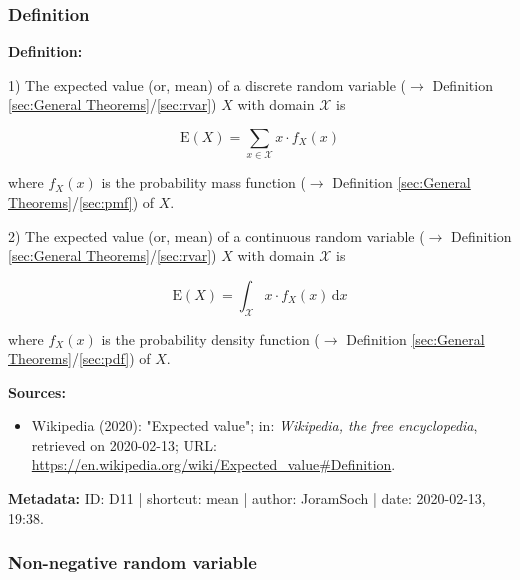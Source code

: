\documentclass[a4paper,12pt,twoside]{book}
\begin{document}
\subsubsection[\textit{Definition}]{Definition} \label{sec:mean}
\setcounter{equation}{0}

\textbf{Definition:}

1) The expected value (or, mean) of a discrete random variable ($\rightarrow$ Definition \ref{sec:General Theorems}/\ref{sec:rvar}) $X$ with domain $\mathcal{X}$ is

\begin{equation} \label{eq:mean-mean-disc}
\mathrm{E}(X) = \sum_{x \in \mathcal{X}} x \cdot f_X(x)
\end{equation}

where $f_X(x)$ is the probability mass function ($\rightarrow$ Definition \ref{sec:General Theorems}/\ref{sec:pmf}) of $X$.

\vspace{1em}
2) The expected value (or, mean) of a continuous random variable ($\rightarrow$ Definition \ref{sec:General Theorems}/\ref{sec:rvar}) $X$ with domain $\mathcal{X}$ is

\begin{equation} \label{eq:mean-mean-cont}
\mathrm{E}(X) = \int_{\mathcal{X}} x \cdot f_X(x) \, \mathrm{d}x
\end{equation}

where $f_X(x)$ is the probability density function ($\rightarrow$ Definition \ref{sec:General Theorems}/\ref{sec:pdf}) of $X$.


\vspace{1em}
\textbf{Sources:}
\begin{itemize}
\item Wikipedia (2020): "Expected value"; in: \textit{Wikipedia, the free encyclopedia}, retrieved on 2020-02-13; URL: \url{https://en.wikipedia.org/wiki/Expected_value#Definition}.
\end{itemize}


\vspace{1em}
\textbf{Metadata:} ID: D11 | shortcut: mean | author: JoramSoch | date: 2020-02-13, 19:38.
\vspace{1em}



\subsubsection[\textbf{Non-negative random variable}]{Non-negative random variable} \label{sec:mean-nnrvar}
\setcounter{equation}{0}
\end{document}
